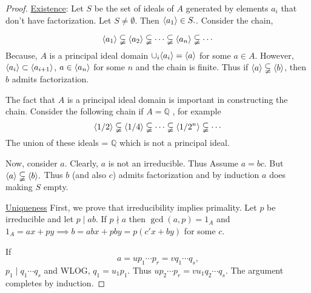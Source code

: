 \begin{proof}
    \noindent \underline{Existence}: Let $S$ be the set of ideals of $A$ generated by elements $a_i$ that don't have factorization. Let $S \neq \emptyset$. Then $\langle a_1 \rangle \in S.$. Consider the chain, 

    \[\langle a_1 \rangle \subsetneqq \langle a_2 \rangle \subsetneqq \cdots \subsetneqq \langle a_n \rangle \subsetneqq \cdots \]
    Because, $A$ is a principal ideal domain $\cup_i \langle a_i \rangle = \langle a \rangle$ for some $a \in A.$ However, $\langle a_i \rangle \subset \langle a_{i +1} \rangle$, $a \in \langle a_n \rangle$ for some $n$ and the chain is finite. Thus if $\langle a \rangle \subsetneqq \langle b \rangle$, then $b$ admits factorization.

    \begin{remark}
        The fact that $A$ is a principal ideal domain is important in constructing the chain. Consider the following chain if  $A = \mathbb{Q}$ , for example
        $$\langle 1/2 \rangle \subsetneqq \langle 1/4 \rangle \subsetneqq  \cdots  \subsetneqq \langle 1/2^n \rangle  \subsetneqq \cdots $$
        The union of these ideals = $\mathbb{Q}$ which is not a principal ideal.
    \end{remark}

    Now, consider $a$. Clearly, $a$ is not an irreducible. Thus Assume $a = bc$. But $\langle a \rangle \subsetneqq \langle b \rangle.$ Thus $b$ (and also $c$) admits factorization and by induction $a$ does making $S$ empty.

    \underline{Uniqueness} First, we prove that irreducibility implies primality. Let $p$ be irreducible and let $p \mid ab$. If $p \nmid a$ then $\gcd(a, p) = 1_A$ and $1_A = ax + py \implies b = abx + pby = p(c'x + by)$ for some $c$.
    
    If $$a = up_1\cdots p_r = vq_1\cdots q_s,$$
    $p_1 \mid q_1 \cdots q_s$ and WLOG, $q_1 = u_1p_1.$ Thus $up_2 \cdots p_r = vu_1q_2\cdots q_s$. The argument completes by induction. 
\end{proof}


